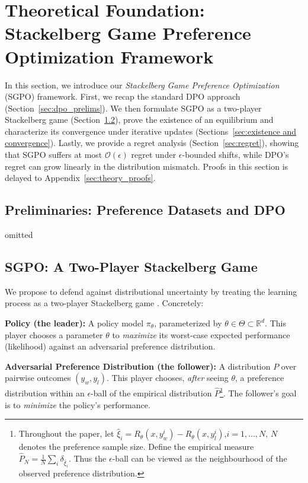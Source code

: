 \section{Theoretical Foundation: Stackelberg Game Preference Optimization Framework}
\label{sec:theory}
In this section, we introduce our \emph{Stackelberg Game Preference Optimization} (SGPO) framework. First, we recap the standard DPO approach (Section~\ref{sec:dpo_prelims}). We then formulate SGPO as a two-player Stackelberg game (Section~\ref{sec:sgpo_formulation}), prove the existence of an equilibrium and characterize its convergence under iterative updates (Sections~\ref{sec:existence and convergence}).  Lastly, we provide a regret analysis (Section~\ref{sec:regret}), showing that SGPO suffers at most \(\mathcal{O}(\epsilon)\) regret under \(\epsilon\)-bounded shifts, while DPO’s regret can grow linearly in the distribution mismatch. Proofs in this section is delayed to Appendix~\ref{sec:theory_proofs}.

\subsection{Preliminaries: Preference Datasets and DPO}
omitted

\subsection{SGPO: A Two-Player Stackelberg Game}
\label{sec:sgpo_formulation}

We propose to defend against distributional uncertainty by treating the learning process as a two-player Stackelberg game \citep{Bacsar1998Dynamic}.  Concretely:

\begin{compactitem}
\item \textbf{Policy (the leader):} A policy model \(\pi_\theta\), parameterized by \(\theta \in \Theta \subset \mathbb{R}^d\).  This player chooses a parameter \(\theta\) to \emph{maximize} its worst-case expected performance (likelihood) against an adversarial preference distribution.
\item \textbf{Adversarial Preference Distribution (the follower):} A distribution \(P\) over pairwise outcomes \((y_w,y_l)\).  This player chooses, \emph{after} seeing \(\theta\), a preference distribution within an \(\epsilon\)-ball of the empirical distribution \(\hat{P}\)\footnote{Throughout the paper, let $\hat{\xi}_i = R_\theta(x,y^i_w) - R_\theta(x,y^i_l)$,$i=1,\dots,N$, $N$ denotes the preference sample size. Define the empirical measure $\hat{P}_N = \tfrac{1}{N}\sum_i \delta_{\hat{\xi}_i}$. Thus the \(\epsilon\)-ball can be viewed as the neighbourhood of the observed preference distribution.}.  The follower’s goal is to \emph{minimize} the policy’s performance.
\end{compactitem}

